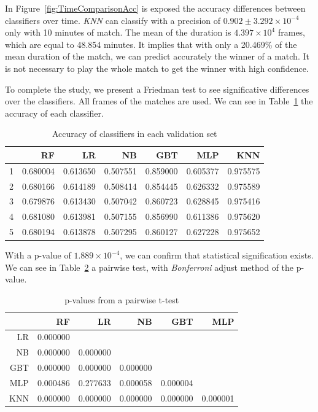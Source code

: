 \documentclass[a4paper,twoside]{article}\usepackage[]{graphicx}\usepackage[]{color}
\begin{document}

In Figure~\ref{fig:TimeComparisonAcc} is exposed the accuracy differences
between classifiers over time. \emph{KNN} can classify with a precision of $0.902 \pm \ensuremath{3.292\times 10^{-4}}$ only
with 10 minutes of match. The mean of the duration is \ensuremath{4.397\times 10^{4}}
frames, which are equal to 48.854 minutes. It implies that
with only a 20.469\% of the mean duration
of the match, we can predict accurately the winner of a match. It is not
necessary to play the whole match to get the winner with high confidence.

To complete the study, we present a Friedman test to see significative
differences over the classifiers. All frames of the matches are used. We
can see in Table~\ref{tab:acc} the accuracy of each classifier.

\begin{table}[ht]
\centering
\begin{tabular}{rrrrrrr}
  \hline
 & RF & LR & NB & GBT & MLP & KNN \\ 
  \hline
1 & 0.680004 & 0.613650 & 0.507551 & 0.859000 & 0.605377 & 0.975575 \\ 
  2 & 0.680166 & 0.614189 & 0.508414 & 0.854445 & 0.626332 & 0.975589 \\ 
  3 & 0.679876 & 0.613430 & 0.507042 & 0.860723 & 0.628845 & 0.975416 \\ 
  4 & 0.681080 & 0.613981 & 0.507155 & 0.856990 & 0.611386 & 0.975620 \\ 
  5 & 0.680194 & 0.613878 & 0.507295 & 0.860127 & 0.627228 & 0.975652 \\ 
   \hline
\end{tabular}
\caption{Accuracy of classifiers in each validation set} 
\label{tab:acc}
\end{table}


With a p-value of \ensuremath{1.889\times 10^{-4}}, we can confirm that statistical
signification exists. We can see in Table~\ref{tab:pvalues} a pairwise test, with
\emph{Bonferroni} adjust method of the p-value.

\begin{table}[ht]
\centering
\begin{tabular}{rrrrrr}
  \hline
 & RF & LR & NB & GBT & MLP \\ 
  \hline
LR & 0.000000 &  &  &  &  \\ 
  NB & 0.000000 & 0.000000 &  &  &  \\ 
  GBT & 0.000000 & 0.000000 & 0.000000 &  &  \\ 
  MLP & 0.000486 & 0.277633 & 0.000058 & 0.000004 &  \\ 
  KNN & 0.000000 & 0.000000 & 0.000000 & 0.000000 & 0.000001 \\ 
   \hline
\end{tabular}
\caption{p-values from a pairwise t-test} 
\label{tab:pvalues}
\end{table}
\end{document}
